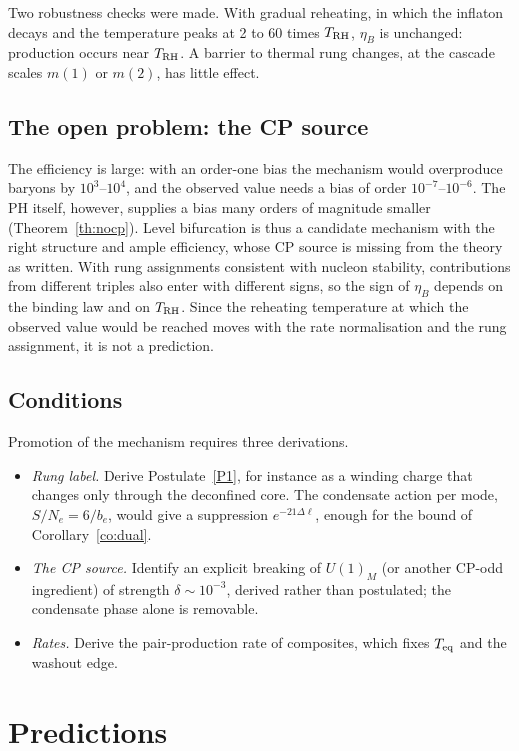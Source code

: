 \documentclass[11pt]{article}
\newcommand{\TRH}{T_{\rm RH}}
\begin{document}
\noindent Two robustness checks were made. With gradual reheating, in which the inflaton decays and the temperature peaks at 2 to 60 times $\TRH$, $\eta_B$ is unchanged: production occurs near $\TRH$. A barrier to thermal rung changes, at the cascade scales $m(1)$ or $m(2)$, has little effect.

\subsection{The open problem: the CP source}\label{sec:open}

The efficiency is large: with an order-one bias the mechanism would overproduce baryons by $10^3$--$10^4$, and the observed value needs a bias of order $10^{-7}$--$10^{-6}$. The PH itself, however, supplies a bias many orders of magnitude smaller (Theorem~\ref{th:nocp}). Level bifurcation is thus a candidate mechanism with the right structure and ample efficiency, whose CP source is missing from the theory as written. With rung assignments consistent with nucleon stability, contributions from different triples also enter with different signs, so the sign of $\eta_B$ depends on the binding law and on $\TRH$. Since the reheating temperature at which the observed value would be reached moves with the rate normalisation and the rung assignment, it is not a prediction.

\subsection{Conditions}

Promotion of the mechanism requires three derivations.
\begin{itemize}
\item[(C1)] \emph{Rung label.} Derive Postulate~\ref{P1}, for instance as a winding charge that changes only through the deconfined core. The condensate action per mode, $S/N_e=6/b_e$, would give a suppression $e^{-21\Delta\ell}$, enough for the bound of Corollary~\ref{co:dual}.
\item[(C2)] \emph{The CP source.} Identify an explicit breaking of $U(1)_M$ (or another CP-odd ingredient) of strength $\delta\sim10^{-3}$, derived rather than postulated; the condensate phase alone is removable.
\item[(C3)] \emph{Rates.} Derive the pair-production rate of composites, which fixes $T_{\rm eq}$ and the washout edge.
\end{itemize}

\section{Predictions}\label{sec:pred}
\end{document}
